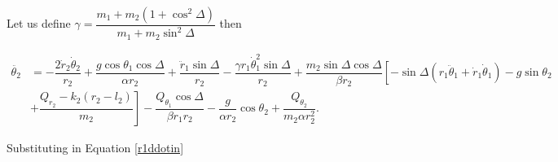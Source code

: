 \documentclass[12pt,a4paper,portrait]{article}
\newcommand{\eq}[1]{Equation \eqref{#1}}
\begin{document}
\begin{landscape}
Let us define $\gamma = \dfrac{m_1+m_2(1+\cos^2{\Delta})}{m_1+m_2\sin^2{\Delta}}$ then

\begin{align*}
	\ddot{\theta_2} &= -\dfrac{2\dot{r}_2\dot{\theta}_2}{r_2} + \dfrac{g\cos{\theta_1}\cos{\Delta}}{\alpha r_2} + \dfrac{\ddot{r}_1\sin{\Delta}}{r_2}- \dfrac{\gamma r_1\dot{\theta}_1^2\sin{\Delta}}{r_2}+ \dfrac{m_2\sin{\Delta}\cos{\Delta}}{\beta r_2}\left[- \sin{\Delta}(r_1\ddot{\theta}_1 + \dot{r}_1\dot{\theta}_1)-g\sin{\theta_2}\right.\\
	&\left.+\dfrac{Q_{r_2}-k_2(r_2-l_2)}{m_2}\right] - \dfrac{Q_{\theta_1}\cos{\Delta}}{\beta r_1r_2} - \dfrac{g}{\alpha r_2}\cos{\theta_2} + \dfrac{Q_{\theta_2}}{m_2\alpha r_2^2}.
\end{align*}

Substituting in \eq{r1ddotin}


\end{landscape}
\end{document}
